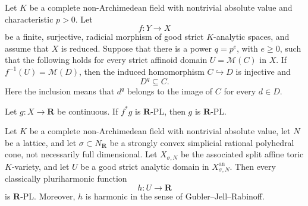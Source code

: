 
\begin{proposition}[Candidate A]
Let \(K\) be a complete non-Archimedean field with nontrivial absolute
value and characteristic \(p>0\).  Let
\[
                         f:Y\longrightarrow X
\]
be a finite, surjective, radicial morphism of good strict \(K\)-analytic
spaces, and assume that \(X\) is reduced.  Suppose that there is a power
\(q=p^e\), with \(e\geq 0\), such that the following holds for every strict
affinoid domain \(U=\mathcal M(C)\) in \(X\).  If
\(f^{-1}(U)=\mathcal M(D)\), then the induced homomorphism
\(C\hookrightarrow D\) is injective and
\[
                              D^q\subseteq C.
\]
Here the inclusion means that \(d^q\) belongs to the image of \(C\) for
every \(d\in D\).

Let \(g:X\to\mathbf R\) be continuous.  If \(f^*g\) is
\(\mathbf R\)-PL, then \(g\) is \(\mathbf R\)-PL.
\end{proposition}

\begin{theorem}[Candidate B]
Let \(K\) be a complete non-Archimedean field with nontrivial absolute
value, let \(N\) be a lattice, and let
\(\sigma\subset N_{\mathbf R}\) be a strongly convex simplicial rational
polyhedral cone, not necessarily full dimensional.  Let
\(X_{\sigma,N}\) be the associated split affine toric \(K\)-variety, and
let \(U\) be a good strict analytic domain in
\(X_{\sigma,N}^{\mathrm{an}}\).  Then every classically pluriharmonic
function
\[
                              h:U\longrightarrow\mathbf R
\]
is \(\mathbf R\)-PL.  Moreover, \(h\) is harmonic in the sense of
Gubler--Jell--Rabinoff.
\end{theorem}
